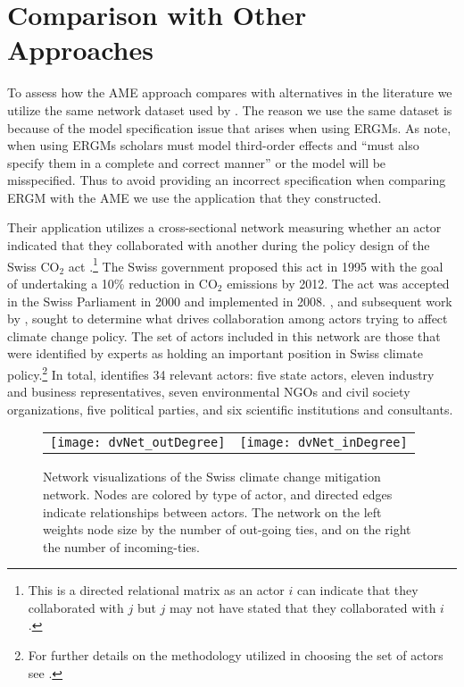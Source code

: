\section{\textbf{Comparison with Other Approaches}}

To assess how the AME approach compares with alternatives in the literature we utilize the same network dataset used by \citet{cranmer:etal:2016}. The reason we use the same dataset is because of the model specification issue that arises when using ERGMs. As \citet[p. 8]{cranmer:etal:2016} note, when using ERGMs scholars must model third-order effects and ``must also specify them in a complete and correct manner'' or the model will be misspecified. Thus to avoid providing an incorrect specification when comparing ERGM with the AME we use the application that they constructed. 

Their application utilizes a cross-sectional network measuring whether an actor indicated that they collaborated with another during the policy design of the Swiss CO$_{2}$ act \citep{ingold:2008}.\footnote{This is a directed relational matrix as an actor $i$ can indicate that they collaborated with $j$ but $j$ may not have stated that they collaborated with $i$.} The Swiss government proposed this act in 1995 with the goal of undertaking a 10\% reduction in CO$_{2}$ emissions by 2012. The act was accepted in the Swiss Parliament in 2000 and implemented in 2008. \citet{ingold:2008}, and subsequent work by \citet{ingold:fischer:2014}, sought to determine what drives collaboration among actors trying to affect climate change policy. The set of actors included in this network are those that were identified by experts as holding an important position in Swiss climate policy.\footnote{For further details on the methodology utilized in choosing the set of actors see \citet{ingold:2008,ingold:fischer:2014}.} In total, \citet{ingold:2008} identifies 34 relevant actors: five state actors, eleven industry and business representatives, seven environmental NGOs and civil society organizations, five political parties, and six scientific institutions and consultants. 

\begin{figure}[ht]
	\centering
	\begin{tabular}{cc}
	\texttt{[image: dvNet\_outDegree]} & 
	\texttt{[image: dvNet\_inDegree]}
	\end{tabular}
	\caption{Network visualizations of the Swiss climate change mitigation network. Nodes are colored by type of actor, and directed edges indicate relationships between actors. The network on the left weights node size by the number of out-going ties, and on the right the number of incoming-ties.}
	\label{fig:dvNet}
\end{figure}
\FloatBarrier

